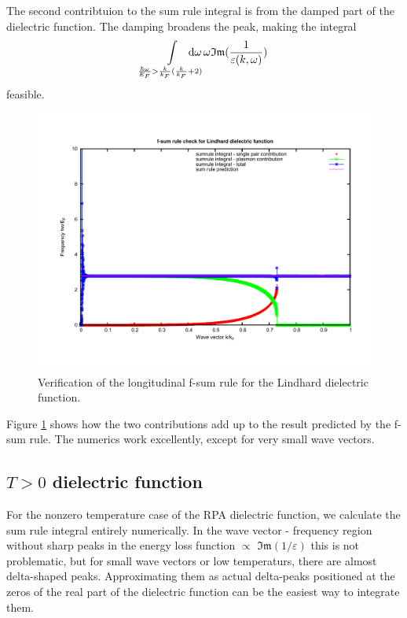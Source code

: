 \documentclass[physics,phd,nolot,nolof]{uccthesis}%
\begin{document}
{The second contribtuion to the sum rule integral is from the damped part of the dielectric function.
The damping broadens the peak, making the integral
\begin{equation}
  \int\limits_{\frac{\hbar\omega}{E_F}>\frac{k}{k_F}(\frac{k}{k_F}+2)}
  \mkern-30mu\mathrm{d}\omega\,
  \omega \mathfrak{Im}(\frac{1}{\varepsilon(k,\omega)})
  \label{eq:fsumrule_lindhard_undamped}
\end{equation}
feasible.
\begin{figure}[h]
  \begin{center}
    \includegraphics[width=\textwidth]{sumrule.pdf}
  \end{center}
  \caption{Verification of the longitudinal f-sum rule for the Lindhard dielectric function.}
  \label{fig:fsumrule_lindhard}
\end{figure}
Figure \ref{fig:fsumrule_lindhard} shows how the two contributions add up to the result predicted by the f-sum rule.
The numerics work excellently, except for very small wave vectors.
\subsection{$T>0$ dielectric function}
For the nonzero temperature case of the RPA dielectric function, we calculate the sum rule integral entirely numerically. 
In the wave vector - frequency region without sharp peaks in the energy loss function $\propto$ $\mathfrak{Im}(1/\varepsilon)$ this is not problematic,
but for small wave vectors or low temperaturs, there are almost delta-shaped peaks. 
Approximating them as actual delta-peaks positioned at the zeros of the real part of the dielectric function can be the easiest way to integrate them. 

}
\end{document}
